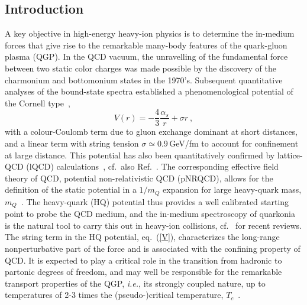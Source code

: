 \documentclass[../report.tex]{subfiles}
\begin{document}
\subsection{Introduction} %
\label{sec_intro}
A key objective in high-energy heavy-ion physics is to determine the in-medium forces that give rise to the remarkable many-body features of the quark-gluon plasma (QGP).
In the QCD vacuum, the unravelling of the fundamental force between two static color charges was made possible by the discovery of the charmonium and bottomonium states in the 1970's. 
Subsequent quantitative analyses of the bound-state spectra established a phenomenological potential of the Cornell type~\cite{Eichten:1979ms}, 
\begin{equation}
V(r) = -\frac{4}{3} \frac{\alpha_s}{r} + \sigma r \ ,
\label{V}
\end{equation} 
with a colour-Coulomb term due to gluon exchange dominant at short distances, and a linear term with string tension $\sigma\simeq0.9$\,GeV/fm to account for confinement at large distance. 
This potential has also been quantitatively confirmed by lattice-QCD (lQCD) calculations~\cite{Bali:2000gf}, cf.~also Ref.~\cite{Brambilla:2004jw}. 
The corresponding effective field theory of QCD, potential non-relativistic QCD (pNRQCD), allows for the definition of the static potential in a  $1/m_Q$ expansion for large heavy-quark mass, $m_Q$~\cite{Brambilla:1999xf,Brambilla:2004wf}. 
The heavy-quark (HQ) potential thus provides a well calibrated starting point to probe the QCD medium, and the in-medium spectroscopy of quarkonia is the natural tool to carry this out in heavy-ion collisions, cf.~\cite{Rapp:2008tf,BraunMunzinger:2009ih,Kluberg:2009wc,Mocsy:2013syh,Liu:2015izf} 
for recent reviews.
The string term in the HQ potential, eq.~(\ref{V}), characterizes the long-range nonperturbative part of the force and is associated with the confining property of QCD. It is expected to play a critical role in the transition from hadronic to partonic degrees of freedom, and may well be responsible for the remarkable transport properties of the QGP, {\it i.e.}, its strongly coupled nature, up to temperatures of 2-3 times the (pseudo-)critical temperature, $T_c$~\cite{Liu:2016ysz}. 
\end{document}
